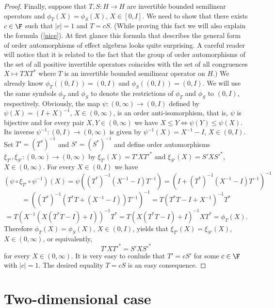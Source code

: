 \documentclass{article}
\begin{document}
\begin{proof}
Finally, suppose that $T, S : H \to H$ are invertible bounded semilinear operators and $\phi_T (X) = \phi_S (X)$, $X \in [0,I]$. We need to show that there exists $c \in \F$ such that $|c| = 1$ and $T=cS$. 
(While proving this fact we will also explain the formula (\ref{nice}).
At first glance this formula that describes the general form of order automorphisms of effect algebras looks quite surprising.  A careful reader will notice that it is related to the fact that the group of order automorphisms of the set of all positive invertible operators coincides with the set of all congruences $X \mapsto TXT^\ast$ where $T$ is an invertible bounded semilinear operator on $H$.) 
We already know $\phi_T ((0,I)) = (0,I)$ and $\phi_S ((0,I)) = (0,I)$. We will use the same symbols $\phi_T$ and $\phi_S$ to denote the restrictions of $\phi_T$ and $\phi_S$ to $(0,I)$, respectively. 
Obviously, the map $\psi : (0, \infty) \to (0,I)$ defined by $\psi (X) = (I+X)^{-1}$, $X \in (0, \infty)$, is an order anti-isomorphism, that is, $\psi$ is bijective and for every pair $X,Y \in (0, \infty)$ we have $X \le Y \iff \psi (Y) \le \psi (X)$.
Its inverse $\psi^{-1} : (0,I) \to (0, \infty)$ is given by $\psi^{-1} (X) = X^{-1} - I$, $X \in (0,I)$. Set $T' = (T^\ast)^{-1}$ and $S' = (S^\ast)^{-1}$ and define order automorphisms $\xi_{T'} , \xi_{S'} : (0, \infty) \to (0, \infty)$ by $\xi_{T'} (X) = T'XT'^\ast$ and $\xi_{S'} (X) = S'XS'^\ast$, $X \in (0,\infty)$. For every $X \in (0,I)$ we have
$$
(\psi \circ \xi_{T'} \circ \psi^{-1}) (X)= \psi \left( (T^\ast)^{-1} (X^{-1} - I) T^{-1} \right) = \left( I +  (T^\ast)^{-1} (X^{-1} - I) T^{-1} \right)^{-1}
$$
$$
= \left(  (T^\ast)^{-1} \left( T^\ast T +  (X^{-1} - I)\right)  T^{-1} \right)^{-1} = T \left( T^\ast T - I + X^{-1}\right)^{-1} T^\ast
$$
$$
= T  \left( X^{-1} \left( X (T^\ast T - I) + I \right) \right)^{-1} T^\ast = T  \left( X (T^\ast T - I) + I  \right)^{-1} XT^\ast = \phi_T (X).
$$
Therefore $\phi_T (X) = \phi_S (X)$, $X \in (0,I)$, yields that $\xi_{T'} (X) = \xi_{S'} (X)$, $X \in (0, \infty)$, or equivalently,
$$
T' X T'^\ast = S' X S'^\ast 
$$
for every $X \in (0, \infty)$. It is very easy to conlude that $T' = cS'$ for some $c \in \F$ with $|c| = 1$. The desired equality $T = cS$ is an easy consequence.
\end{proof}

\section{Two-dimensional case}
\end{document}
